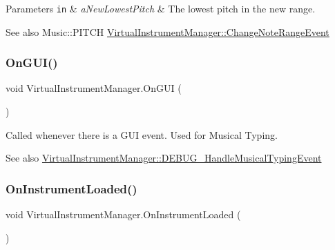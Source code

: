 \begin{DoxyParams}[1]{Parameters}
\mbox{\tt in}  & {\em a\+New\+Lowest\+Pitch} & The lowest pitch in the new range.\\
\hline
\end{DoxyParams}
\begin{DoxySeeAlso}{See also}
Music\+::\+P\+I\+T\+CH \hyperlink{class_virtual_instrument_manager_1_1_change_note_range_event}{Virtual\+Instrument\+Manager\+::\+Change\+Note\+Range\+Event} 
\end{DoxySeeAlso}
\mbox{\label{group___virtual_instrument_manager_event_types_gac64ceff10f8db3a11868f251cea72349}} 
\subsubsection{\texorpdfstring{On\+G\+U\+I()}{OnGUI()}}
{\footnotesize\ttfamily void Virtual\+Instrument\+Manager.\+On\+G\+UI (\begin{DoxyParamCaption}{ }\end{DoxyParamCaption})\hspace{0.3cm}{\ttfamily [private]}}



Called whenever there is a G\+UI event. Used for Musical Typing. 

\begin{DoxySeeAlso}{See also}
\hyperlink{group___audio_testing_ga3a8d2d91b97d0541c8a509e5785e9bdf}{Virtual\+Instrument\+Manager\+::\+D\+E\+B\+U\+G\+\_\+\+Handle\+Musical\+Typing\+Event} 
\end{DoxySeeAlso}
\mbox{\label{group___virtual_instrument_manager_event_types_gac7d5b65484e450a400e32ab416ebc9f6}} 
\subsubsection{\texorpdfstring{On\+Instrument\+Loaded()}{OnInstrumentLoaded()}}
{\footnotesize\ttfamily void Virtual\+Instrument\+Manager.\+On\+Instrument\+Loaded (\begin{DoxyParamCaption}{ }\end{DoxyParamCaption})}



